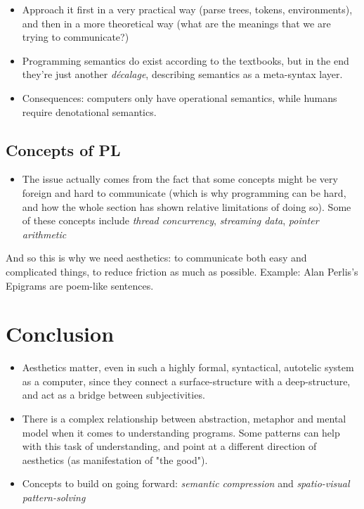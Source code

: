 \documentclass{article}
\begin{document}
\begin{itemize}
  \item Approach it first in a very practical way (parse trees, tokens, environments), and then in a more theoretical way (what are the meanings that we are trying to communicate?)
  \item Programming semantics do exist according to the textbooks, but in the end they're just another \emph{décalage}, describing semantics as a meta-syntax layer.
  \item Consequences: computers only have operational semantics, while humans require denotational semantics.
\end{itemize}

\subsection{Concepts of PL}

\begin{itemize}
  \item The issue actually comes from the fact that some concepts might be very foreign and hard to communicate (which is why programming can be hard, and how the whole section has shown relative limitations of doing so). Some of these concepts include \emph{thread concurrency}, \emph{streaming data}, \emph{pointer arithmetic}
\end{itemize}

And so this is why we need aesthetics: to communicate both easy and complicated things, to reduce friction as much as possible. Example: Alan Perlis's Epigrams are poem-like sentences.

\section{Conclusion}

\begin{itemize}
  \item Aesthetics matter, even in such a highly formal, syntactical, autotelic system as a computer, since they connect a surface-structure with a deep-structure, and act as a bridge between subjectivities.
  \item There is a complex relationship between abstraction, metaphor and mental model when it comes to understanding programs. Some patterns can help with this task of understanding, and point at a different direction of aesthetics (as manifestation of "the good").
  \item Concepts to build on going forward: \emph{semantic compression} and \emph{spatio-visual pattern-solving}
\end{itemize}
\end{document}
